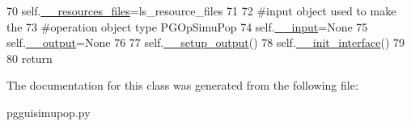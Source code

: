 \begin{DoxyCode}
70         self.\hyperlink{classpgguisimupop_1_1PGGuiSimuPop_a29e5325264dcb90dc66e13ec0bcf41c4}{\_\_resources\_files}=ls\_resource\_files
71 
72         \textcolor{comment}{#input object used to make the}
73         \textcolor{comment}{#operation object type PGOpSimuPop}
74         self.\hyperlink{classpgguisimupop_1_1PGGuiSimuPop_aa26382890f391ad36221f7e9140160ad}{\_\_input}=\textcolor{keywordtype}{None}
75         self.\hyperlink{classpgguisimupop_1_1PGGuiSimuPop_a5828c39c80729dd98c741fefe328b2dc}{\_\_output}=\textcolor{keywordtype}{None}
76 
77         self.\hyperlink{classpgguisimupop_1_1PGGuiSimuPop_aedcf7bad6db37ff4101cae47f03c8207}{\_\_setup\_output}()
78         self.\hyperlink{classpgguisimupop_1_1PGGuiSimuPop_ad04f5a8506b5ba111ff2a4ad4925566c}{\_\_init\_interface}()
79         
80         \textcolor{keywordflow}{return}
\end{DoxyCode}


The documentation for this class was generated from the following file\+:\begin{DoxyCompactItemize}
\item 
pgguisimupop.\+py\end{DoxyCompactItemize}
